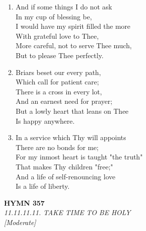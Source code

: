 \begin{enumerate}
    \item And if some things I do not ask \\
        In my cup of blessing be, \\
        I would have my spirit filled the more \\
        With grateful love to Thee, \\
        More careful, not to serve Thee much, \\
        But to please Thee perfectly.

    \item Briars beset our every path, \\
        Which call for patient care; \\
        There is a cross in every lot, \\
        And an earnest need for prayer; \\
        But a lowly heart that leans on Thee \\
        Is happy anywhere.

    \item In a service which Thy will appoints \\
        There are no bonds for me; \\
        For my inmost heart is taught "the truth" \\
        That makes Thy children "free;" \\
        And a life of self-renouncing love \\
        Is a life of liberty.

\end{enumerate}

\newpage
\begin{center}
    {\Large \textbf{HYMN 357}}
    \\
    \textit{11.11.11.11. TAKE TIME TO BE HOLY}
    \\
    \textit{\small [Moderate]}
\end{center}
\vspace{1em}

